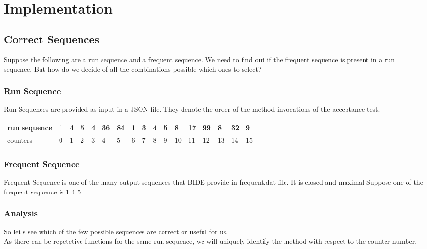 
\chapter{Implementation} %

\label{Chapter5} %



\section{Correct Sequences}
Suppose the following are a run sequence and a frequent sequence.
We need to find out if the frequent sequence is present in a run sequence. But how do we decide of all the combinations possible which ones to select?

\subsection{Run Sequence}
Run Sequences are provided as input in a JSON file. They denote the order of the  method invocations of the acceptance test.\\
\begin{tabular}{l|llllllllllllllll}
run sequence& 1 &4 &5 &4 &36 &84 &1 &3 &4 &5 &8 &17 &99 &8 &32 &9\\
\hline
 counters&0 &1 &2 &3 &4  &5  &6  &7  &8  &9 &10 &11 &12 &13 &14 &15 \\
\end{tabular}

\subsection{Frequent Sequence}
Frequent Sequence is one of the many output sequences that BIDE provide in frequent.dat file.
It is closed and maximal
Suppose one of the frequent sequence is 1 4 5

\subsection{Analysis}
So let's see which of the few possible sequences are correct or useful for us.\\
As there can be repetetive functions for the same run sequence, we will uniquely identify the method with respect to the counter number.

